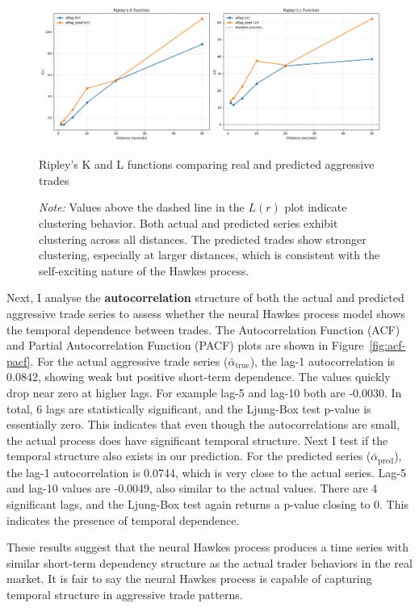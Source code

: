 \begin{figure}[H]
    \centering
    \includegraphics[width=\linewidth]{figures/RIPLEY_181330.png}
    \caption{Ripley's K and L functions comparing real and predicted aggressive trades}
    \caption*{\textit{Note:} Values above the dashed line in the \( L(r) \) plot indicate clustering behavior. Both actual and predicted series exhibit clustering across all distances. The predicted trades show stronger clustering, especially at larger distances, which is consistent with the self-exciting nature of the Hawkes process.}
    \label{fig:ripley-kl}
\end{figure}



Next, I analyse the \textbf{autocorrelation} structure of both the actual and predicted aggressive trade series to assess whether the neural Hawkes process model shows the temporal dependence between trades. The Autocorrelation Function (ACF) and Partial Autocorrelation Function (PACF) plots are shown in Figure~\ref{fig:acf-pacf}. For the actual aggressive trade series ($\bar{\alpha}_\text{true}$), the lag-1 autocorrelation is 0.0842, showing weak but positive short-term dependence. The values quickly drop near zero at higher lags. For example lag-5 and lag-10 both are -0.0030. In total, 6 lags are statistically significant, and the Ljung-Box test p-value is essentially zero. This indicates that even though the autocorrelations are small, the actual process does have significant temporal structure. Next I test if the temporal structure also exists in our prediction. For the predicted series ($\bar{\alpha}_\text{pred}$), the lag-1 autocorrelation is 0.0744, which is very close to the actual series. Lag-5 and lag-10 values are -0.0049, also similar to the actual values. There are 4 significant lags, and the Ljung-Box test again returns a p-value closing to 0. This indicates the presence of temporal dependence.

These results suggest that the neural Hawkes process produces a time series with similar short-term dependency structure as the actual trader behaviors in the real market. It is fair to say the neural Hawkes process is capable of capturing temporal structure in aggressive trade patterns.

